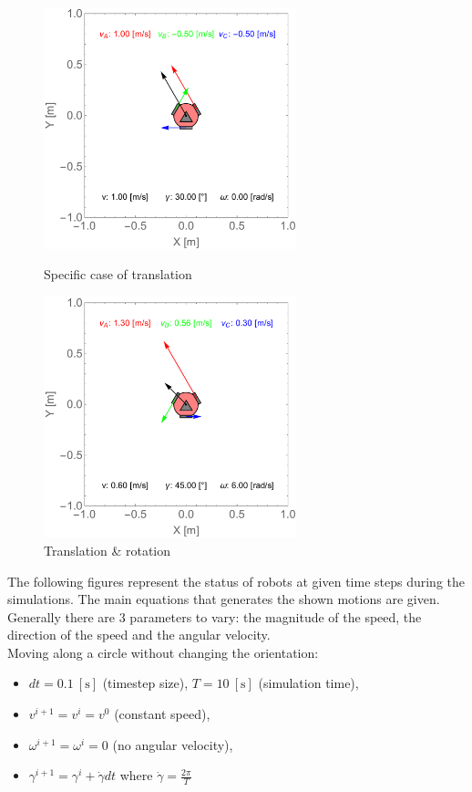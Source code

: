 \documentclass[12pt,english]{article}
\begin{document}
\begin{figure}[htb!]
	\centering
	\centering
	\includegraphics[height=7cm]{figures/2d_simulation/relation_v_1_g_30_w_0}
	\caption{Specific case of translation}
	\label{relation_v_1_g_30_w_0}
	\endminipage\hfill
	\centering
	\includegraphics[height=7cm]{figures/2d_simulation/relation_v_06_g_45_w_6}
	\caption{Translation \& rotation}
	\label{relation_v_06_g_45_w_6}
	\endminipage\hfill
\end{figure}
\newpage
The following figures represent the status of robots at given time steps during the simulations. The main equations that generates the shown motions are given. Generally there are 3 parameters to vary: the magnitude of the speed, the direction of the speed and the angular velocity.\\[0.3cm]
\noindent Moving along a circle without changing the orientation:
\begin{itemize}
	\item $dt=0.1~[\text{s}]$ (timestep size), $T=10~[\text{s}]$ (simulation time),
	\item $v^{i+1} = v^{i} = v^{0}$ (constant speed),
	\item $\omega^{i+1} = \omega^{i} = 0$ (no angular velocity),
	\item $\gamma^{i+1} = \gamma^i + \dot \gamma dt$ where $\dot \gamma = \frac{2 \pi}{T}$
\end{itemize}
\end{document}
